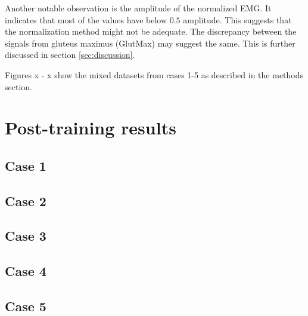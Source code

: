 \documentclass[../main.tex]{subfiles}
\begin{document}
Another notable observation is the amplitude of the normalized \ac{EMG}.
It indicates that most of the values have below $0.5$ amplitude.
This suggests that the normalization method might not be adequate.
The discrepancy between the signals from gluteus maximus (GlutMax) may suggest the same. 
This is further discussed in section \ref{sec:discussion}.

Figures x - x show the mixed datasets from cases 1-5 as described in the methods section.

\section{Post-training results}
\label{sec:post-training-results}

\subsection{Case 1}
\label{sec:results-case1}

\subsection{Case 2}
\label{sec:results-case1}

\subsection{Case 3}
\label{sec:results-case1}

\subsection{Case 4}
\label{sec:results-case1}

\subsection{Case 5}
\label{sec:results-case1}

\end{document}
